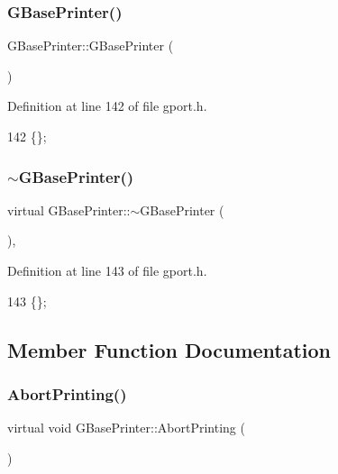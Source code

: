 \subsubsection{\texorpdfstring{G\+Base\+Printer()}{GBasePrinter()}}
{\footnotesize\ttfamily G\+Base\+Printer\+::\+G\+Base\+Printer (\begin{DoxyParamCaption}{ }\end{DoxyParamCaption})\hspace{0.3cm}{\ttfamily [inline]}}



Definition at line 142 of file gport.\+h.


\begin{DoxyCode}
142 \{\};
\end{DoxyCode}
\mbox{\label{class_g_base_printer_a6d7e3c06b0131a5e3ed20b717c01ef82}} 
\subsubsection{\texorpdfstring{$\sim$\+G\+Base\+Printer()}{~GBasePrinter()}}
{\footnotesize\ttfamily virtual G\+Base\+Printer\+::$\sim$\+G\+Base\+Printer (\begin{DoxyParamCaption}{ }\end{DoxyParamCaption})\hspace{0.3cm}{\ttfamily [inline]}, {\ttfamily [virtual]}}



Definition at line 143 of file gport.\+h.


\begin{DoxyCode}
143 \{\};
\end{DoxyCode}


\subsection{Member Function Documentation}
\mbox{\label{class_g_base_printer_a09ba32c950923f9b69a704a61652de6a}} 
\subsubsection{\texorpdfstring{Abort\+Printing()}{AbortPrinting()}}
{\footnotesize\ttfamily virtual void G\+Base\+Printer\+::\+Abort\+Printing (\begin{DoxyParamCaption}{ }\end{DoxyParamCaption})\hspace{0.3cm}{\ttfamily [pure virtual]}}

